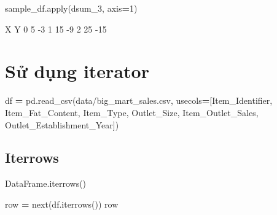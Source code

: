 \documentclass[
]{book}
\newenvironment{Shaded}{\begin{snugshade}}{\end{snugshade}}
\newcommand{\BuiltInTok}[1]{#1}
\newcommand{\DecValTok}[1]{\textcolor[rgb]{0.00,0.00,0.81}{#1}}
\newcommand{\NormalTok}[1]{#1}
\newcommand{\OperatorTok}[1]{\textcolor[rgb]{0.81,0.36,0.00}{\textbf{#1}}}
\newcommand{\StringTok}[1]{\textcolor[rgb]{0.31,0.60,0.02}{#1}}
\begin{document}
\begin{Shaded}
\begin{Highlighting}[]
\NormalTok{sample\_df.}\BuiltInTok{apply}\NormalTok{(dsum\_3, axis}\OperatorTok{=}\DecValTok{1}\NormalTok{)}
\end{Highlighting}
\end{Shaded}

\begin{Shaded}
\begin{Highlighting}[]
\NormalTok{    X   Y}
\NormalTok{0   5   {-}3}
\NormalTok{1   15  {-}9}
\NormalTok{2   25  {-}15}
\end{Highlighting}
\end{Shaded}

\section{Sử dụng iterator}\label{sux1eed-dux1ee5ng-iterator}

\begin{Shaded}
\begin{Highlighting}[]
\NormalTok{df }\OperatorTok{=}\NormalTok{ pd.read\_csv(}\StringTok{\textquotesingle{}data/big\_mart\_sales.csv\textquotesingle{}}\NormalTok{, usecols}\OperatorTok{=}\NormalTok{[}\StringTok{\textquotesingle{}Item\_Identifier\textquotesingle{}}\NormalTok{, }\StringTok{\textquotesingle{}Item\_Fat\_Content\textquotesingle{}}\NormalTok{, }\StringTok{\textquotesingle{}Item\_Type\textquotesingle{}}\NormalTok{, }\StringTok{\textquotesingle{}Outlet\_Size\textquotesingle{}}\NormalTok{, }\StringTok{\textquotesingle{}Item\_Outlet\_Sales\textquotesingle{}}\NormalTok{, }\StringTok{\textquotesingle{}Outlet\_Establishment\_Year\textquotesingle{}}\NormalTok{])}
\end{Highlighting}
\end{Shaded}

\subsection{Iterrows}\label{iterrows}

\begin{Shaded}
\begin{Highlighting}[]
\NormalTok{DataFrame.iterrows()}
\end{Highlighting}
\end{Shaded}

\begin{Shaded}
\begin{Highlighting}[]
\NormalTok{row }\OperatorTok{=} \BuiltInTok{next}\NormalTok{(df.iterrows())}
\NormalTok{row}
\end{Highlighting}
\end{Shaded}
\end{document}
